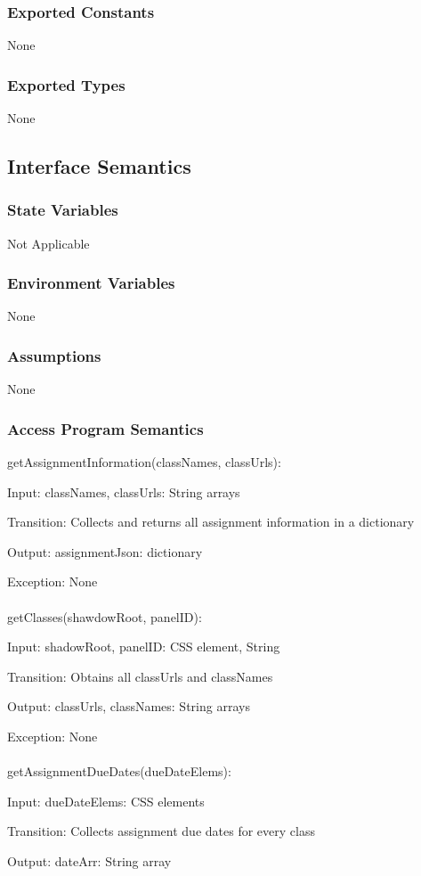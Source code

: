 \documentclass[12pt, titlepage]{article}
\begin{document}
\subsubsection{Exported Constants}
None
\subsubsection{Exported Types}
None
\subsection{Interface Semantics}
\subsubsection{State Variables}
Not Applicable
\subsubsection{Environment Variables}
None
\subsubsection{Assumptions}
None
\subsubsection{Access Program Semantics}
getAssignmentInformation(classNames, classUrls):

    Input: classNames, classUrls: String arrays

    Transition: Collects and returns all assignment information in a dictionary

    Output: assignmentJson: dictionary

    Exception: None
\\
\\
getClasses(shawdowRoot, panelID):

    Input: shadowRoot, panelID: CSS element, String

    Transition: Obtains all classUrls and classNames

    Output: classUrls, classNames: String arrays

    Exception: None
\\
\\
getAssignmentDueDates(dueDateElems):

    Input: dueDateElems: CSS elements

    Transition: Collects assignment due dates for every class

    Output: dateArr: String array
\end{document}
